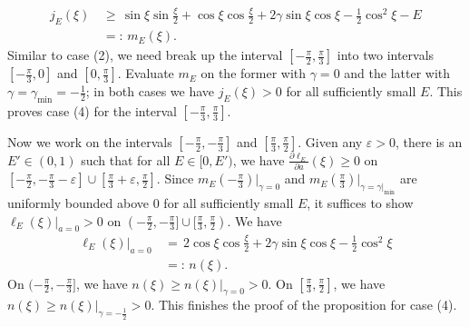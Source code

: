 \documentclass[11 pt]{article}
\renewcommand\({\left(}
\renewcommand\){\right)}
\newcommand\e{\varepsilon}
\newcommand\<{\langle}
\renewcommand\>{\rangle}
\newcommand\g{\gamma}
\newcommand\8{\infty}
\newcommand{\pd}{\partial}
\begin{document}
\begin{align*}
j_E(\xi) \,&\geq\, \sin \xi \sin \frac{\xi}{2} + \cos \xi \cos \frac{\xi}{2} + 2\gamma \sin \xi \cos \xi - \frac{1}{2}\cos^2\xi - E
\\
&=:\, m_E(\xi). 
\end{align*}
Similar to case (2), we need break up the interval $[-\frac{\pi}{2}, \frac{\pi}{3}]$ into two intervals $[-\frac{\pi}{3},0]$ and $[0, \frac{\pi}{3}]$. Evaluate $m_E$ on the former with $\g = 0$ and the latter with $\g = \g_{\text{min}} = -\frac{1}{2}$; in both cases we have $j_E(\xi) > 0$ for all sufficiently small $E$. This proves case (4) for the interval $[-\frac{\pi}{3}, \frac{\pi}{3}]$.

Now we work on the intervals $[-\frac{\pi}{2}, -\frac{\pi}{3}]$ and $[\frac{\pi}{3}, \frac{\pi}{2}]$. Given any $\e > 0$, there is an $E' \in (0,1)$ such that for all $E \in [0,E')$, we have $\frac{\pd \ell_E}{\pd a}(\xi) \geq 0$ on $[-\frac{\pi}{2}, -\frac{\pi}{3} - \e] \cup [\frac{\pi}{3} + \e, \frac{\pi}{2}]$. Since $m_E(-\frac{\pi}{3})|_{\gamma = 0}$ and $m_E(\frac{\pi}{3})|_{\gamma = \g|_{\text{min}}}$ are uniformly bounded above $0$ for all sufficiently small $E$, it suffices to show $\ell_E(\xi)|_{a = 0} > 0$ on $(-\frac{\pi}{2}, -\frac{\pi}{3}] \cup [\frac{\pi}{3}, \frac{\pi}{2})$. We have 
\begin{align*}
\ell_E(\xi)|_{a = 0} \,&=\, 2\cos\xi \cos\frac{\xi}{2} + 2\gamma \sin \xi \cos \xi - \frac{1}{2}\cos^2\xi
\\
&=:\, n(\xi). 
\end{align*}
On $(-\frac{\pi}{2}, -\frac{\pi}{3}]$, we have $n(\xi) \geq n(\xi)|_{\gamma = 0} > 0$. On $[\frac{\pi}{3}, \frac{\pi}{2}]$, we have $n(\xi) \geq n(\xi)|_{\gamma = -\frac{1}{2}} > 0$. This finishes the proof of the proposition for case (4). 
\end{document}
